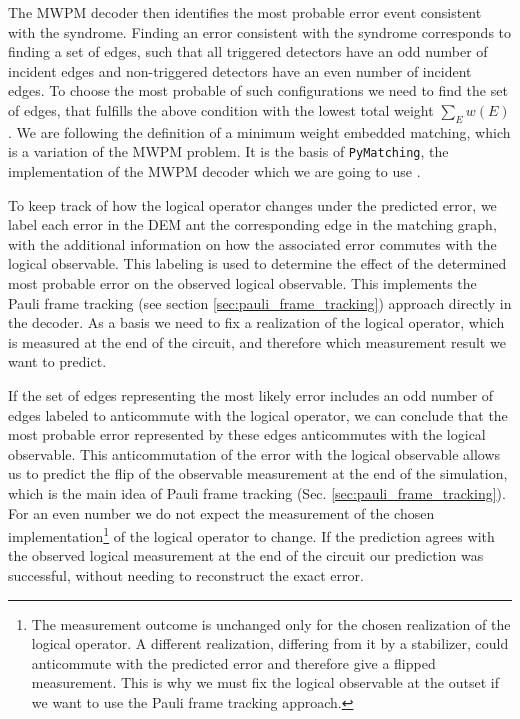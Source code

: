 The MWPM decoder then identifies the most probable error event consistent with the syndrome.
Finding an error consistent with the syndrome corresponds to finding a set of edges, such that all triggered detectors have an odd number of incident edges 
and non-triggered detectors have an even number of incident edges.
To choose the most probable of such configurations we need to find the set of edges, that fulfills the above condition with the lowest total weight $\sum_E w(E)$.
We are following the definition of a minimum weight embedded matching, which is a variation of the MWPM problem. 
It is the basis of \texttt{PyMatching}, the implementation of the MWPM decoder which we are going to use \cite{pymatching_loger_paper}. 

To keep track of how the logical operator changes under the predicted error, we label each error in the DEM ant the corresponding edge in the matching graph, 
with the additional information on how the associated error commutes with the logical observable.
This labeling is used to determine the effect of the determined most probable error on the observed logical observable. 
This implements the Pauli frame tracking (see section \ref{sec:pauli_frame_tracking}) approach directly in the decoder. 
As a basis we need to fix a realization of the logical operator, which is measured at the end of the circuit, and therefore which measurement result we want to predict.

If the set of edges representing the most likely error includes an odd number of edges labeled to anticommute with the logical operator, 
we can conclude that the most probable error represented by these edges anticommutes with the logical observable.
This anticommutation of the error with the logical observable allows us to predict the flip of the observable measurement at the end of the simulation, 
which is the main idea of Pauli frame tracking (Sec. \ref{sec:pauli_frame_tracking}).
For an even number we do not expect the measurement of the chosen implementation\footnote{
    The measurement outcome is unchanged only for the chosen realization of the logical operator. 
    A different realization, differing from it by a stabilizer, could anticommute with the predicted error and therefore give a flipped measurement. 
    This is why we must fix the logical observable at the outset if we want to use the Pauli frame tracking approach.
} of the logical operator to change. 
If the prediction agrees with the observed logical measurement at the end of the circuit our prediction was successful, without needing to reconstruct the exact error.

